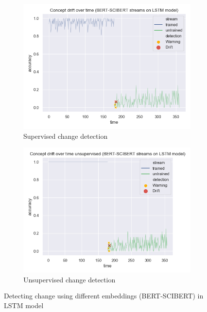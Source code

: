 \documentclass[12pt]{report}
\begin{document}
\begin{figure}[H]
\centering
\begin{subfigure}{.5\textwidth}
  \centering
  \includegraphics[width=\linewidth]{assets/detecting-change/diff_embed_lstm_wos_1_BERT_SCIBERT.png}
  \caption{Supervised change detection}
  \label{fig:lstm-diff-embed-super-B-S}
\end{subfigure}%
\begin{subfigure}{.5\textwidth}
  \centering
  \includegraphics[width=\linewidth]{assets/detecting-change/diff_embed_lstm_wos_1_BERT_SCIBERT_unsupervised.png}
  \caption{Unsupervised change detection}
  \label{fig:lstm-diff-embed-unsuper-B-S}
\end{subfigure}
\caption{Detecting change using different embeddings (BERT-SCIBERT) in LSTM model}
\label{fig:lstm-diff-embed-B-S}
\end{figure}
\end{document}
